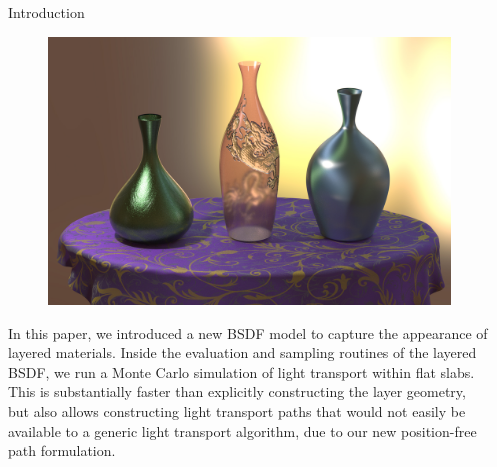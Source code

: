 \documentclass[final]{beamer}
\newlength{\sepwid}
\newlength{\twocolwid}
\begin{document}
\begin{frame}[t] %
\vspace{-1.5cm}
\begin{columns}[t] %
    \begin{column}{\sepwid}\end{column} %
    \begin{column}{\twocolwid} %
        \begin{block}{Introduction}
            \begin{figure}
                \includegraphics[width=0.9\linewidth]{images/teaser/teaser.jpg}
            \end{figure}
        
            \large{
            In this paper, we introduced a new BSDF model to capture the appearance of layered materials. 
            Inside the evaluation and sampling routines of the layered BSDF, we run a Monte Carlo simulation of light transport within flat slabs. 
            This is substantially faster than explicitly constructing the layer geometry, 
            but also allows constructing light transport paths that would not easily be available to a generic light transport algorithm, 
            due to our new position-free path formulation.
            
            \vspace{1cm}
            
}
\end{block}
\end{column}
\end{columns}
\end{frame}
\end{document}

